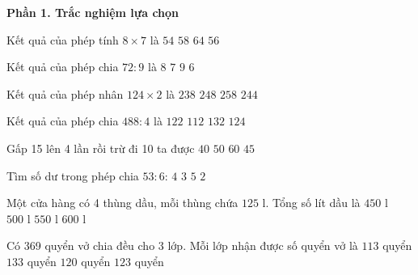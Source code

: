 \textbf{Phần 1. Trắc nghiệm lựa chọn}

\begin{ex} %
Kết quả của phép tính $8 \times 7$ là
\choice
{$54$}
{$58$}
{$64$}
{\True $56$}
\end{ex}

\begin{ex} %
Kết quả của phép chia $72 : 9$ là
\choice
{\True $8$}
{$7$}
{$9$}
{$6$}
\end{ex}

\begin{ex} %
Kết quả của phép nhân $124 \times 2$ là
\choice
{$238$}
{\True $248$}
{$258$}
{$244$}
\end{ex}

\begin{ex} %
Kết quả của phép chia $488 : 4$ là
\choice
{\True $122$}
{$112$}
{$132$}
{$124$}
\end{ex}

\begin{ex} %
Gấp 15 lên 4 lần rồi trừ đi 10 ta được
\choice
{$40$}
{\True $50$}
{$60$}
{$45$}
\end{ex}

\begin{ex} %
Tìm số dư trong phép chia $53 : 6$:
\choice
{$4$}
{$3$}
{\True $5$}
{$2$}
\end{ex}

\begin{ex} %
Một cửa hàng có 4 thùng dầu, mỗi thùng chứa $125\text{ l}$. Tổng số lít dầu là
\choice
{$450\text{ l}$}
{\True $500\text{ l}$}
{$550\text{ l}$}
{$600\text{ l}$}
\end{ex}

\begin{ex} %
Có 369 quyển vở chia đều cho 3 lớp. Mỗi lớp nhận được số quyển vở là
\choice
{$113$ quyển}
{$133$ quyển}
{$120$ quyển}
{\True $123$ quyển}
\end{ex}


